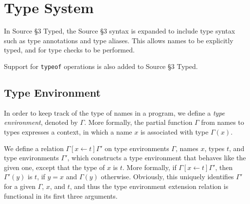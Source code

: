 \newcommand{\Rule}[2]{\genfrac{}{}{0.7pt}{}{{\setlength{\fboxrule}{0pt}\setlength{\fboxsep}{3mm}\fbox{$#1$}}}{{\setlength{\fboxrule}{0pt}\setlength{\fboxsep}{3mm}\fbox{$#2$}}}}

\newcommand{\TruE}{\textbf{\texttt{true}}}
\newcommand{\FalsE}{\textbf{\texttt{false}}}
\newcommand{\AndOp}{\texttt{\&\&}}
\newcommand{\OrOp}{\texttt{||}}
\newcommand{\ThenOp}{\texttt{?}}
\newcommand{\ElseOp}{\texttt{:}}
\newcommand{\Rc}{\texttt{\}}}
\newcommand{\Lc}{\texttt{\{}}
\newcommand{\Rp}{\texttt{)}}
\newcommand{\Lp}{\texttt{(}}
\newcommand{\Fun}{\textbf{\texttt{function}}}
\newcommand{\Let}{\textbf{\texttt{let}}}
\newcommand{\Return}{\textbf{\texttt{return}}}
\newcommand{\Const}{\textbf{\texttt{const}}}
\newcommand{\If}{\textbf{\texttt{if}}}
\newcommand{\Else}{\textbf{\texttt{else}}}
\newcommand{\Bool}{\texttt{boolean}}
\newcommand{\Number}{\texttt{number}}
\newcommand{\String}{\texttt{string}}
\newcommand{\Undefined}{\texttt{undefined}}
\newcommand{\Null}{\texttt{null}}
\newcommand{\Any}{\texttt{any}}
\newcommand{\Void}{\texttt{void}}
\newcommand{\Pred}{\textit{Pred}}
\newcommand{\type}{\textit{type}}
\newcommand{\polytype}{\textit{polytype}}
\newcommand{\predtype}{\textit{predtype}}
\newcommand{\ExtractPos}{\ensuremath{\textit{Extract}^+}}
\newcommand{\ExtractNeg}{\ensuremath{\textit{Extract}^-}}

\newtheorem{definition}{Definition}[section]

\section{Type System}  

In Source \S 3 Typed, the Source \S 3 syntax is expanded to include type syntax such as type annotations and type aliases.
This allows names to be explicitly typed, and for type checks to be performed.

Support for \texttt{typeof} operations is also added to Source \S 3 Typed.

\subsection{Type Environment}

In order to keep track of the type of names in a program, we define a
\emph{type environment}, denoted by $\Gamma$. More
formally,
the partial function $\Gamma$ from names to types expresses a 
context, in which a name $x$ is associated with type $\Gamma(x)$. 

We define a relation $\Gamma[x \leftarrow t]\Gamma'$ on type environments 
$\Gamma$, names $x$, types $t$, and type environments $\Gamma'$,
which constructs a type environment that behaves like the 
given one, except that the type of $x$ is $t$. More formally, 
if $\Gamma[x \leftarrow t]\Gamma'$, then $\Gamma'(y)$ is $t$, 
if $y=x$ and $\Gamma(y)$ 
otherwise. Obviously, this uniquely identifies $\Gamma'$ for
a given $\Gamma$, $x$, and $t$, and thus the type environment extension
relation is functional in its first three arguments.

